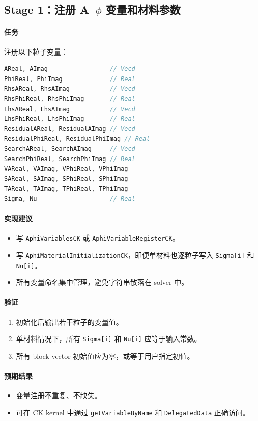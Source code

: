 \documentclass[UTF8,a4paper,11pt]{ctexart}
\newcommand{\code}[1]{\texttt{#1}}
\begin{document}
\subsection{Stage 1：注册 A--$\phi$ 变量和材料参数}

\paragraph{任务}
注册以下粒子变量：
\begin{lstlisting}[language=C++]
AReal, AImag                 // Vecd
PhiReal, PhiImag             // Real
RhsAReal, RhsAImag           // Vecd
RhsPhiReal, RhsPhiImag       // Real
LhsAReal, LhsAImag           // Vecd
LhsPhiReal, LhsPhiImag       // Real
ResidualAReal, ResidualAImag // Vecd
ResidualPhiReal, ResidualPhiImag // Real
SearchAReal, SearchAImag     // Vecd
SearchPhiReal, SearchPhiImag // Real
VAReal, VAImag, VPhiReal, VPhiImag
SAReal, SAImag, SPhiReal, SPhiImag
TAReal, TAImag, TPhiReal, TPhiImag
Sigma, Nu                    // Real
\end{lstlisting}

\paragraph{实现建议}
\begin{itemize}
  \item 写 \code{AphiVariablesCK} 或 \code{AphiVariableRegisterCK}。
  \item 写 \code{AphiMaterialInitializationCK}，即便单材料也逐粒子写入 \code{Sigma[i]} 和 \code{Nu[i]}。
  \item 所有变量命名集中管理，避免字符串散落在 solver 中。
\end{itemize}

\paragraph{验证}
\begin{enumerate}
  \item 初始化后输出若干粒子的变量值。
  \item 单材料情况下，所有 \code{Sigma[i]} 和 \code{Nu[i]} 应等于输入常数。
  \item 所有 block vector 初始值应为零，或等于用户指定初值。
\end{enumerate}

\paragraph{预期结果}
\begin{itemize}
  \item 变量注册不重复、不缺失。
  \item 可在 CK kernel 中通过 \code{getVariableByName} 和 \code{DelegatedData} 正确访问。
\end{itemize}
\end{document}
